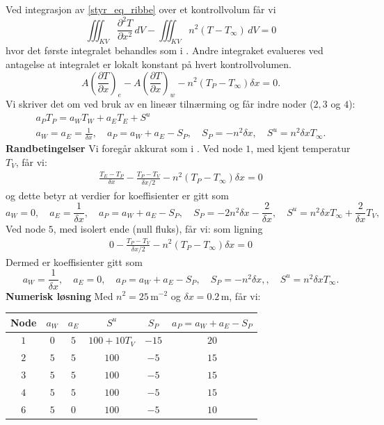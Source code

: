 Ved integrasjon av \eqref{styr_eq_ribbe} over et kontrollvolum får vi 
\[\iiint_{KV} \frac{\partial^2 T}{\partial x^2}\, dV - \iiint_{KV}n^2(T-T_\infty) \, dV=0\]
hvor det første integralet behandles som i . Andre integraket evalueres ved antagelse at integralet er lokalt konstant på hvert kontrollvolumen.
\[A\left(\frac{\partial T}{\partial x}\right)_e -A\left(\frac{\partial T}{\partial x}\right)_w - n^2(T_P-T_\infty)\delta x=0.\]
Vi skriver det om ved bruk av  en lineær tilnærming og får indre noder ($2, 3$ og $4$):
\begin{align*}
a_P T_P = a_W T_W + a_E T_E + S^u\\
a_W = a_E = \frac{1}{\delta x}, \quad a_P = a_W + a_E - S_P, \quad S_P = -n^2 \delta x, \quad S^u = n^2 \delta x T_\infty.
\end{align*}
\textbf{Randbetingelser}
Vi foregår akkurat som i . Ved node $1$, med kjent temperatur $T_V$, får vi:
\begin{align*}
\frac{T_E-T_P}{\delta x}-\frac{T_P-T_V}{\delta x/2}-n^2(T_P-T_\infty)\delta x=0
\end{align*}
og dette betyr at verdier for koeffisienter er gitt som
\[
a_W = 0, \quad a_E = \frac{1}{\delta x},\quad a_P = a_W+a_E-S_P, \quad S_P = -2n^2 \delta x - \frac{2}{\delta x}, \quad S^u = n^2 \delta x T_\infty + \frac{2}{\delta x} T_V, 
\]
Ved node $5$, med isolert ende (null fluks), får vi: som ligning
\begin{align*}
0-\frac{T_P-T_V}{\delta x/2}-n^2(T_P-T_\infty)\delta x=0
\end{align*}
Dermed er koeffisienter gitt som
\[
a_W=\frac{1}{\delta x}, \quad a_E = 0,\quad a_P=a_W+a_E-S_P, \quad S_P = -n^2 \delta x, , \quad S^u = n^2 \delta x T_\infty.
\]
\textbf{Numerisk løsning}
Med $n^2 = 25\,\text{m}^{-2}$ og $\delta x = 0.2\,\text{m}$, får vi:
\begin{center}
\begin{tabular}{|c|c|c|c|c|c|}
\hline
Node & $a_W$ & $a_E$ & $S^u$ & $S_P$ & $a_P=a_W+a_E-S_P$ \\
\hline
$1$ & $0$ & $5$ & $100+10T_V$ & $-15$ & $20$ \\
$2$ & $5$ & $5$ &   $100$ &  $-5$ & $15$ \\
$3$ & $5$ & $5$ &   $100$ &  $-5$ & $15$ \\
$4$ & $5$ & $5$ &   $100$ &  $-5$ & $15$ \\
$6$ & $5$ & $0$ &  $100$ & $-5$ & $10$ \\
\hline
\end{tabular}
\end{center}
